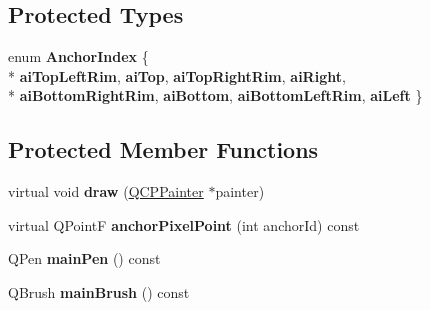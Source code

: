 \subsection*{Protected Types}
\begin{DoxyCompactItemize}
\item 
enum {\bfseries Anchor\-Index} \{ \\*
{\bfseries ai\-Top\-Left\-Rim}, 
{\bfseries ai\-Top}, 
{\bfseries ai\-Top\-Right\-Rim}, 
{\bfseries ai\-Right}, 
\\*
{\bfseries ai\-Bottom\-Right\-Rim}, 
{\bfseries ai\-Bottom}, 
{\bfseries ai\-Bottom\-Left\-Rim}, 
{\bfseries ai\-Left}
 \}
\end{DoxyCompactItemize}
\subsection*{Protected Member Functions}
\begin{DoxyCompactItemize}
\item 
\hypertarget{classQCPItemEllipse_afe97ec827adb05f000fe007783faae3c}{virtual void {\bfseries draw} (\hyperlink{classQCPPainter}{Q\-C\-P\-Painter} $\ast$painter)}\label{classQCPItemEllipse_afe97ec827adb05f000fe007783faae3c}

\item 
\hypertarget{classQCPItemEllipse_ad3c607304dba081e2f778b6a81b903bb}{virtual Q\-Point\-F {\bfseries anchor\-Pixel\-Point} (int anchor\-Id) const }\label{classQCPItemEllipse_ad3c607304dba081e2f778b6a81b903bb}

\item 
\hypertarget{classQCPItemEllipse_afc78d49ed5ffa886bccf18f297f83d30}{Q\-Pen {\bfseries main\-Pen} () const }\label{classQCPItemEllipse_afc78d49ed5ffa886bccf18f297f83d30}

\item 
\hypertarget{classQCPItemEllipse_a2a9757204877c9d0fd07adfb26d6b1d8}{Q\-Brush {\bfseries main\-Brush} () const }\label{classQCPItemEllipse_a2a9757204877c9d0fd07adfb26d6b1d8}

\end{DoxyCompactItemize}

